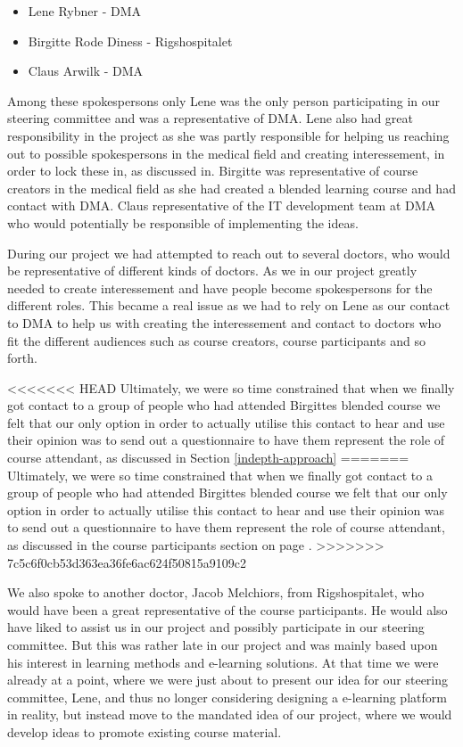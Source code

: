 \begin{itemize}
\item Lene Rybner - DMA
\item Birgitte Rode Diness - Rigshospitalet
\item Claus Arwilk - DMA
\end{itemize}


Among these spokespersons only Lene was the only person participating in our steering committee and was a representative of DMA. Lene also had great responsibility in the project as she was partly responsible for helping us reaching out to possible spokespersons in the medical field and creating interessement, in order to lock these in, as discussed in\cite{callon}. Birgitte was representative of course creators in the medical field as she had created a blended learning course and had contact with DMA. Claus representative of the IT development team at DMA who would potentially be responsible of implementing the ideas.

During our project we had attempted to reach out to several doctors, who would be representative of different kinds of doctors. As we in our project greatly needed to create interessement and have people become spokespersons for the different roles. This became a real issue as we had to rely on Lene as our contact to DMA to help us with creating the interessement and contact to doctors who fit the different audiences such as course creators, course participants and so forth.

<<<<<<< HEAD
Ultimately, we were so time constrained that when we finally got contact to a group of people who had attended Birgittes blended course we felt that our only option in order to actually utilise this contact to hear and use their opinion was to send out a questionnaire to have them represent the role of course attendant, as discussed in Section \ref{indepth-approach}
=======
Ultimately, we were so time constrained that when we finally got contact to a group of people who had attended Birgittes blended course we felt that our only option in order to actually utilise this contact to hear and use their opinion was to send out a questionnaire to have them represent the role of course attendant, as discussed in the course participants section on page \pageref{indepth:questionnaire}.
>>>>>>> 7c5c6f0cb53d363ea36fe6ac624f50815a9109c2

We also spoke to another doctor, Jacob Melchiors, from Rigshospitalet, who would have been a great representative of the course participants. He would also have liked to assist us in our project and possibly participate in our steering committee. But this was rather late in our project and was mainly based upon his interest in learning methods and e-learning solutions. At that time we were already at a point, where we were just about to present our idea for our steering committee, Lene, and thus no longer considering designing a e-learning platform in reality, but instead move to the mandated idea of our project, where we would develop ideas to promote existing course material.

